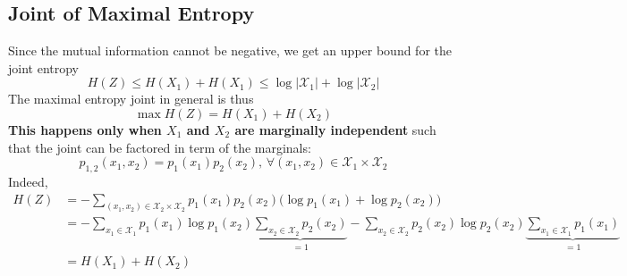 \documentclass{article}
\numberwithin{equation}{section}
\theoremstyle{casep}
\begin{document}
\subsection{Joint of Maximal Entropy}
Since the mutual information cannot be negative, we get an upper bound for the 
joint entropy
\[
        H(Z) \leq H(X_1) + H(X_1) \leq \log|\mathcal{X}_1| + \log|\mathcal{X}_2|
\]
The maximal entropy joint in general is thus
\[
        \max H(Z) = H(X_1) + H(X_2)
\]
\textbf{This happens only when $X_1$ and $X_2$ are marginally independent} such that the joint 
can be factored in term of the marginals:
\[
        p_{1,2}(x_1, x_2) = p_1(x_1)p_2(x_2),\, \forall (x_1,x_2)\in 
        \mathcal{X}_1\times \mathcal{X}_2
\]
Indeed,
\begin{align*}
        H(Z) &= -\sum_{(x_1, x_2) \in \mathcal{X}_2 \times \mathcal{X}_2} 
        p_1(x_1)p_2(x_2) \big(\log p_1(x_1) + \log p_2(x_2) \big) \\
             &= -\sum_{x_1 \in \mathcal{X}_1}
             p_1(x_1) \log p_1(x_2) \underbrace{\sum_{x_2 \in \mathcal{X}_2}p_2(x_2)}_{=1} - 
             \sum_{x_2 \in \mathcal{X}_2}p_2(x_2) \log p_2(x_2) 
             \underbrace{\sum_{x_1 \in \mathcal{X}_1} p_1(x_1) }_{=1}
             \\
             &= H(X_1) + H(X_2)
\end{align*}


\end{document}
